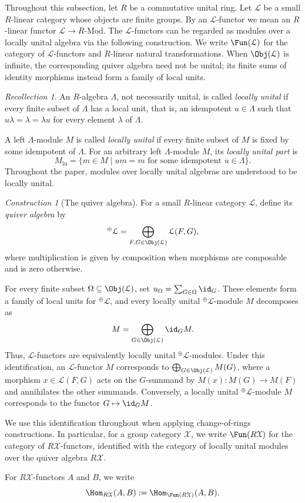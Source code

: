 \documentclass{amsart}
\numberwithin{equation}{section}%
\theoremstyle{remark}
\newtheorem{Cons}[equation]{Construction}
\newtheorem{Rec}[equation]{Recollection}
\theoremstyle{definition}
\begin{document}
Throughout this subsection, let $R$ be a commutative unital ring.
Let $\mathcal L$ be a small $R$-linear category whose objects are
finite groups. By an $\mathcal L$-functor we mean an $R$-linear
functor $\mathcal L\longrightarrow R\text{-Mod}$.
%
The $\mathcal L$-functors can be regarded as modules over a locally
unital algebra via the following construction. We write $\Fun(\mathcal L)$ for the category of
$\mathcal L$-functors and $R$-linear natural transformations. When
$\Obj(\mathcal L)$ is infinite, the corresponding quiver algebra need
not be unital; its finite sums of identity morphisms instead form a
family of local units.
%
\begin{Rec}
\label{rec:locally-unital-algebras}
An $R$-algebra $\Lambda$, not necessarily unital, is called
\emph{locally unital} if every finite subset of $\Lambda$ has a
local unit, that is, an idempotent $u\in\Lambda$ such that
$u\lambda=\lambda=\lambda u$ for every element $\lambda$ of $\Lambda$.

A left $\Lambda$-module $M$ is called \emph{locally unital} if every
finite subset of $M$ is fixed by some idempotent of $\Lambda$.
For an arbitrary left $\Lambda$-module $M$, its \emph{locally unital
	part} is
\[
M_{\mathrm{lu}}
=
\{m\in M\mid um=m
\text{ for some idempotent }u\in\Lambda\}.
\]
Throughout the paper, modules over locally unital algebras are
understood to be locally unital.
\end{Rec}
%
\begin{Cons}[The quiver algebra]
\label{con:quiver-algebra}
For a small $R$-linear category $\mathcal L$, define its
\emph{quiver algebra} by
\[
{}^{\oplus}\mathcal L
=
\bigoplus_{F,G\in\Obj(\mathcal L)}
\mathcal L(F,G),
\]
where multiplication is given by composition when morphisms are
composable and is zero otherwise.

For every finite subset $\Omega\subseteq\Obj(\mathcal L)$, set
$u_\Omega=\sum_{G\in\Omega}\id_G$. These elements form a family of
local units for ${}^{\oplus}\mathcal L$, and every locally unital
${}^{\oplus}\mathcal L$-module $M$ decomposes as
\[
M=\bigoplus_{G\in\Obj(\mathcal L)}\id_GM.
\]
%
Thus, $\mathcal L$-functors are equivalently locally unital
${}^{\oplus}\mathcal L$-modules. Under this identification, an
$\mathcal L$-functor $M$ corresponds to
$\bigoplus_{G\in\Obj(\mathcal L)}M(G)$, where a morphism
$x\in\mathcal L(F,G)$ acts on the $G$-summand by
$M(x)\colon M(G)\to M(F)$ and annihilates the other summands.
Conversely, a locally unital ${}^{\oplus}\mathcal L$-module $M$
corresponds to the functor $G\mapsto\id_GM$.

We use this identification throughout when applying change-of-rings
constructions. In particular, for a group category $\mathcal X$, we
write $\Fun(R\mathcal X)$ for the category of $R\mathcal X$-functors,
identified with the category of locally unital modules over the
quiver algebra $R\mathcal X$.

For $R\mathcal X$-functors $A$ and $B$, we write
\[
\Hom_{R\mathcal X}(A,B)
:=
\Hom_{\Fun(R\mathcal X)}(A,B).
\]
\end{Cons}
\end{document}
